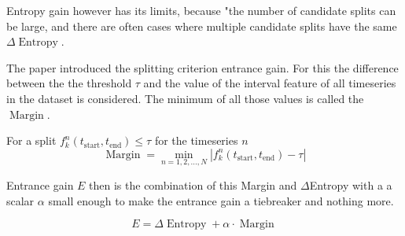 Entropy gain however has its limits, because "the number of  %
candidate splits can be large, and there are often cases 
where multiple candidate splits have the same $\Delta\operatorname{Entropy}$. %


The paper introduced the splitting criterion entrance gain. %
For this the difference between the the threshold $\tau$ and the value
of the interval feature of all timeseries in the dataset is considered. The minimum
of all those values is called the $\operatorname{Margin}$.

For a split $f_k^n(t_{\mathrm{start}}, t_{\mathrm{end}}) \leq \tau$ for the timeseries $n$ 
\[
	\operatorname{Margin} = \min_{n = 1,2, ..., N} \left|f_k^n (t_{\mathrm{start}}, t_{\mathrm{end}}) - \tau \right|
\]

Entrance gain $E$ then is the combination of this Margin and $\Delta$Entropy with a a scalar $\alpha$ small 
enough to make the entrance gain a tiebreaker and nothing more.

\[
	E = \Delta\operatorname{Entropy} + \alpha \cdot\operatorname{Margin}
\]

